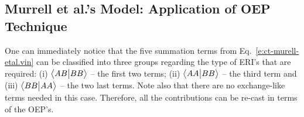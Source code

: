 \subsection{\label{s:34rag} Murrell et al.'s Model: Application of OEP Technique}

One can immediately notice that the five summation terms
from Eq.~\eqref{e:ct-murell-etal.vin} can be classified into three groups
regarding the type of ERI's that are required:
(i) $\bigl\langle {AB} \bigl\lvert {BB} \bigr\rangle$ -- the first two terms;
(ii) $\bigl\langle {AA} \bigl\lvert {BB} \bigr\rangle$ -- the third term and
(iii) $\bigl\langle {BB} \bigl\lvert {AA} \bigr\rangle$ -- the two last terms. 
Note also that there are no exchange\hyp{}like terms needed in this case.
Therefore, all the contributions can be re\hyp{}cast in terms of the OEP's.

